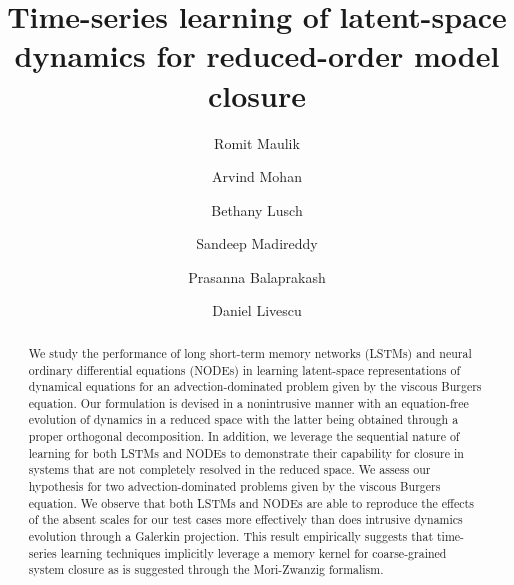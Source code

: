 \documentclass[preprint,12pt]{elsarticle}
\begin{document}
\begin{frontmatter}


\title{Time-series learning of latent-space dynamics for reduced-order model closure}


\author[label1]{Romit Maulik}
\author[label2]{Arvind Mohan}
\author[label1]{Bethany Lusch}
\author[label3]{Sandeep Madireddy}
\author[label1,label3]{Prasanna Balaprakash}
\author[label2]{Daniel Livescu}

\address[label1]{Argonne Leadership Computing Facility, Argonne National Laboratory, Lemont, IL 60439, USA}
\address[label2]{Center for Nonlinear Studies/CCS-2 Division, Los Alamos National Laboratory, Los Alamos, NM 87545, USA}
\address[label3]{Mathematics and Computer Science Division, Argonne National Laboratory, Lemont, IL 60439, USA}



\begin{abstract}
We study the performance of long short-term memory networks (LSTMs) and neural ordinary differential equations (NODEs) in learning latent-space representations of dynamical equations for an advection-dominated problem given by the viscous Burgers equation. Our formulation is devised in a nonintrusive manner with an equation-free evolution of dynamics in a reduced space with the latter being obtained through a proper orthogonal decomposition. In addition, we leverage the sequential nature of learning for both LSTMs and NODEs to demonstrate their capability for closure in systems that are not completely resolved in the reduced space. We assess our hypothesis for two advection-dominated problems given by the viscous Burgers equation. We observe that both LSTMs and NODEs are able to reproduce the effects of the absent scales for our test cases more effectively than does intrusive dynamics evolution through a Galerkin projection. This result empirically suggests that time-series learning techniques implicitly leverage a memory kernel for coarse-grained system closure as is suggested through the Mori-Zwanzig formalism.


\end{abstract}
\end{frontmatter}
\end{document}
